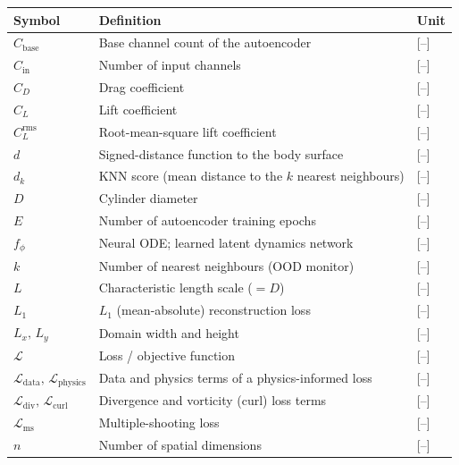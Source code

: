 \begin{longtable}{p{2.5cm}p{9cm}p{2.5cm}}
    \toprule
    Symbol & Definition & Unit \\
    \midrule\endhead %
    $C_\text{base}$      & Base channel count of the autoencoder            & [--] \\
    $C_\text{in}$        & Number of input channels                         & [--] \\
    $C_D$                & Drag coefficient                                 & [--] \\
    $C_L$                & Lift coefficient                                 & [--] \\
    $C_L^\text{rms}$     & Root-mean-square lift coefficient                & [--] \\
    $d$                  & Signed-distance function to the body surface     & [--] \\
    $d_k$                & KNN score (mean distance to the $k$ nearest neighbours) & [--] \\
    $D$                  & Cylinder diameter                                & [--] \\
    $E$                  & Number of autoencoder training epochs            & [--] \\
    $f_\phi$             & Neural ODE; learned latent dynamics network      & [--] \\
    $k$                  & Number of nearest neighbours (OOD monitor)       & [--] \\
    $L$                  & Characteristic length scale ($=D$)               & [--] \\
    $L_1$                & $L_1$ (mean-absolute) reconstruction loss        & [--] \\
    $L_x,\,L_y$          & Domain width and height                          & [--] \\
    $\mathcal{L}$        & Loss / objective function                        & [--] \\
    $\mathcal{L}_\text{data},\,\mathcal{L}_\text{physics}$ & Data and physics terms of a physics-informed loss & [--] \\
    $\mathcal{L}_\text{div},\,\mathcal{L}_\text{curl}$ & Divergence and vorticity (curl) loss terms & [--] \\
    $\mathcal{L}_\text{ms}$ & Multiple-shooting loss                        & [--] \\
    $n$                  & Number of spatial dimensions                     & [--] \\

\end{longtable}
